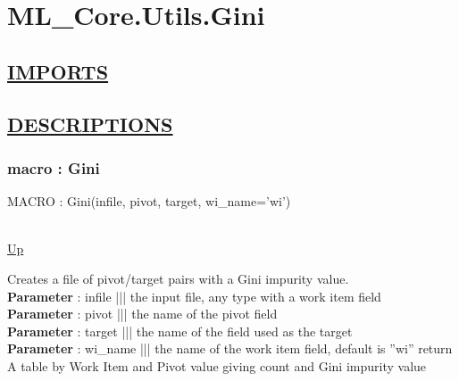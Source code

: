 \chapter*{ML\_Core.Utils.Gini}
\hypertarget{ML_Core.Utils.Gini}{}

\section*{\underline{IMPORTS}}

\section*{\underline{DESCRIPTIONS}}
\subsection*{macro : Gini}
\hypertarget{ecldoc:ml_core.utils.gini}{MACRO : Gini(infile, pivot, target, wi\_name='wi')} \\
\hyperlink{ecldoc:}{Up} \\
\par
Creates a file of pivot/target pairs with a Gini impurity value. \\
\textbf{Parameter} : infile ||| the input file, any type with a work item field \\
\textbf{Parameter} : pivot ||| the name of the pivot field \\
\textbf{Parameter} : target ||| the name of the field used as the target \\
\textbf{Parameter} : wi\_name ||| the name of the work item field, default is ''wi'' return A table by Work Item and Pivot value giving count and Gini impurity value \\
